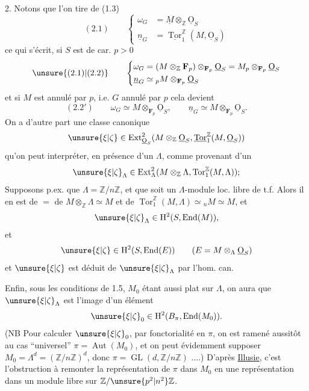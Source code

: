 2. Notons que  l'on tire de (1.3)
\[
(2.1)\qquad\left\{\begin{aligned}
\omega_G&=\underline M\otimes_{\mathbb Z}\underline{\mathrm O}_S\\
\underline n_G&=\underline{\operatorname{Tor}}_1^{\mathbb Z}(M,\underline{\mathrm O}_S)
\end{aligned}\right.
\]
ce qui s'écrit, si $S$ est de car. $p>0$
\[
\unsure{(2.1)|(2.2)}\qquad\left\{\begin{aligned}
\omega_G&=(M\otimes_{\mathbb Z}\mathbf F_p)\otimes_{\mathbf F_p}\underline{\mathrm O}_S=M_p\otimes_{\mathbf F_p}\underline{\mathrm O}_S\\
\underline n_G&\simeq {}_pM\otimes_{\mathbf F_p}\underline{\mathrm O}_S
\end{aligned}\right.
\]
et si $M$ est annulé par $p$, i.e. $G$ annulé par $p$ cela devient
\[
(2.2')\qquad \omega_G\simeq M\otimes_{\mathbf F_p}\underline{\mathrm O}_S,\qquad \underline n_G\simeq M\otimes_{\mathbf F_p}\underline{\mathrm O}_S.
\]
On a d'autre part une classe canonique
\[
\unsure{\xi|\zeta}\in\operatorname{Ext}^{2}_{\underline{\mathrm O}_S}(M\otimes_{\mathbb Z}\underline{\mathrm O}_S,\underline{\operatorname{Tor}}_1^{\mathbb Z}(M,\underline{\mathrm O}_S))
\]
qu'on peut interpréter, en présence d'un $\Lambda$, comme provenant d'un
\[
\unsure{\xi|\zeta}_\Lambda\in\operatorname{Ext}^{2}_{\Lambda}(M\otimes_{\mathbb Z}\Lambda,\operatorname{Tor}_1^{\mathbb Z}(M,\Lambda));
\]
Supposons p.ex. que $\Lambda=\mathbb Z/n\mathbb Z$, et que  soit un $\Lambda$-module loc. libre de t.f. Alors il en est de $=$ de $M\otimes_{\mathbb Z}\Lambda\simeq M$ et de $\operatorname{Tor}_1^{\mathbb Z}(M,\Lambda)\simeq{}_nM\simeq M$, et
\[
\unsure{\xi|\zeta}_\Lambda\in\mathrm H^2(S,\operatorname{End}(M)),
\]
et 
\[
\unsure{\xi|\zeta}\in\mathrm H^2(S,\operatorname{End}(E))\qquad(E=M\otimes_\Lambda\underline{\mathrm O}_S)
\]
et $\unsure{\xi|\zeta}$ est déduit de $\unsure{\xi|\zeta}_\Lambda$ par l'hom. can.

Enfin, sous les conditions de 1.5, $M_0$ étant aussi plat sur $\Lambda$, on aura que $\unsure{\xi|\zeta}_\Lambda$ est l'image d'un élément
\[
\unsure{\xi|\zeta}_0\in\mathrm H^2(B_\pi,\operatorname{End}(M_0)).
\]
(NB Pour calculer $\unsure{\xi|\zeta}_0$, par fonctorialité en $\pi$, on est ramené aussitôt au cas ``universel'' $\pi=\operatorname{Aut}(M_0)$, et on peut évidemment supposer $M_0=\Lambda^d=(\mathbb Z/n\mathbb Z)^d$, donc $\pi=\operatorname{GL}(d,\mathbb Z/n\mathbb Z)$ ....) D'après \uline{Illusie}, c'est l'obstruction à remonter la représentation de $\pi$ dans $M_0$ en une représentation dans un module libre sur $\mathbb Z/\unsure{p^2|n^2}\mathbb Z$.

